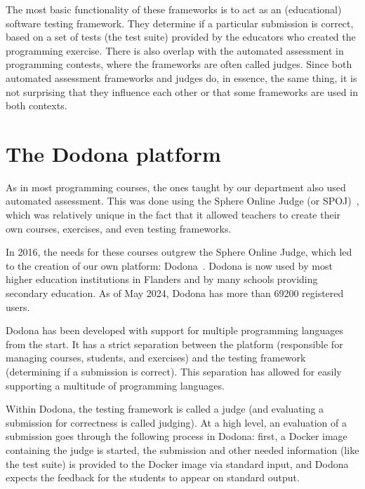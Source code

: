 \documentclass[./main]{subfiles}
\begin{document}
The most basic functionality of these frameworks is to act as an (educational) software testing framework.
They determine if a particular submission is correct, based on a set of tests (the test suite) provided by the educators who created the programming exercise.
There is also overlap with the automated assessment in programming contests, where the frameworks are often called judges.
Since both automated assessment frameworks and judges do, in essence, the same thing, it is not surprising that they influence each other or that some frameworks are used in both contexts.

\section{The Dodona platform}\label{sec:dodona}

As in most programming courses, the ones taught by our department also used automated assessment.
This was done using the Sphere Online Judge (or SPOJ)~\autocite{kosowskiApplicationOnlineJudge2008}, which was relatively unique in the fact that it allowed teachers to create their own courses, exercises, and even testing frameworks.

In 2016, the needs for these courses outgrew the Sphere Online Judge, which led to the creation of our own platform: Dodona~\autocite{vanpetegemDodonaLearnCode2023}.
Dodona is now used by most higher education institutions in Flanders and by many schools providing secondary education.
As of May 2024, Dodona has more than \num{69200} registered users.

Dodona has been developed with support for multiple programming languages from the start.
It has a strict separation between the platform (responsible for managing courses, students, and exercises) and the testing framework (determining if a submission is correct).
This separation has allowed for easily supporting a multitude of programming languages.

Within Dodona, the testing framework is called a judge (and evaluating a submission for correctness is called judging).
At a high level, an evaluation of a submission goes through the following process in Dodona: first, a Docker image containing the judge is started, the submission and other needed information (like the test suite) is provided to the Docker image via standard input, and Dodona expects the feedback for the students to appear on standard output.
\end{document}
